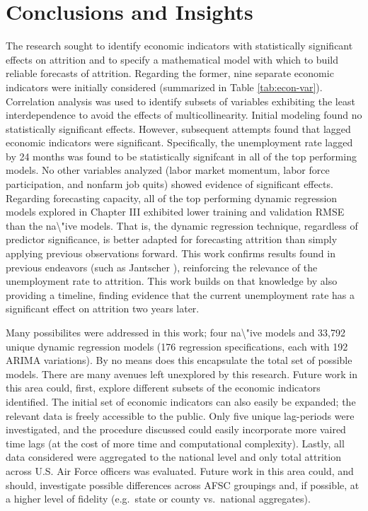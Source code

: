 \documentclass[12pt,letterpaper,toc=flat,oneside]{report}
\theoremstyle{definition}
\theoremstyle{definition}
\theoremstyle{definition}
\theoremstyle{remark}
\begin{document}
\newpage

\hypertarget{conclusions-and-insights}{%
\chapter{Conclusions and Insights}\label{conclusions-and-insights}}

The research sought to identify economic indicators with statistically
significant effects on attrition and to specify a mathematical model
with which to build reliable forecasts of attrition. Regarding the
former, nine separate economic indicators were initially considered
(summarized in Table \ref{tab:econ-var}). Correlation analysis was used
to identify subsets of variables exhibiting the least interdependence to
avoid the effects of multicollinearity. Initial modeling found no
statistically significant effects. However, subsequent attempts found
that lagged economic indicators were significant. Specifically, the
unemployment rate lagged by 24 months was found to be statistically
signifcant in all of the top performing models. No other variables
analyzed (labor market momentum, labor force participation, and nonfarm
job quits) showed evidence of significant effects. Regarding forecasting
capacity, all of the top performing dynamic regression models explored
in Chapter III exhibited lower training and validation RMSE than the
na\textbackslash{}"ive models. That is, the dynamic regression
technique, regardless of predictor significance, is better adapted for
forecasting attrition than simply applying previous observations
forward. This work confirms results found in previous endeavors (such as
Jantscher \cite{jantscher-2016}), reinforcing the relevance of the
unemployment rate to attrition. This work builds on that knowledge by
also providing a timeline, finding evidence that the current
unemployment rate has a significant effect on attrition two years later.

Many possibilites were addressed in this work; four
na\textbackslash{}"ive models and 33,792 unique dynamic regression
models (176 regression specifications, each with 192 ARIMA variations).
By no means does this encapsulate the total set of possible models.
There are many avenues left unexplored by this research. Future work in
this area could, first, explore different subsets of the economic
indicators identified. The initial set of economic indicators can also
easily be expanded; the relevant data is freely accessible to the
public. Only five unique lag-periods were investigated, and the
procedure discussed could easily incorporate more vaired time lags (at
the cost of more time and computational complexity). Lastly, all data
considered were aggregated to the national level and only total
attrition across U.S. Air Force officers was evaluated. Future work in
this area could, and should, investigate possible differences across
AFSC groupings and, if possible, at a higher level of fidelity
(e.g.~state or county vs.~national aggregates).
\end{document}
